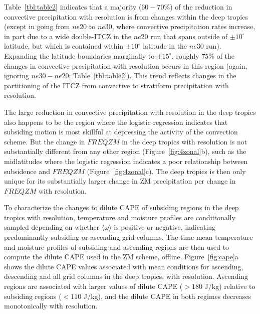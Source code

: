 \documentclass[times]{qjrms4}
\begin{document}
Table~\ref{tbl:table2} indicates that a majority ($60-70 \%$) of the reduction in convective precipitation with resolution is from changes within the deep tropics (except in going from $ne20$ to $ne30$, where convective precipitation rates increase, in part due to a wide double-ITCZ in the $ne20$ run that spans outside of $\pm 10^{\circ}$ latitude, but which is contained within $\pm 10^{\circ}$ latitude in the $ne30$ run). Expanding the latitude boundaries marginally to $\pm 15^{\circ}$, roughly $75\%$ of the changes in convective precipitation with resolution occurs in this region (again, ignoring $ne30-ne20$; Table~\ref{tbl:table2}). This trend reflects changes in the partitioning of the ITCZ from convective to stratiform precipitation with resolution. 

The large reduction in convective precipitation with resolution in the deep tropics also happens to be the region where the logistic regression indicates that subsiding motion is most skillful at depressing the activity of the convection scheme. But the change in $FREQZM$ in the deep tropics with resolution is not substantially different from any other region (Figure~\ref{fig:4zonal}b), such as the midlatitudes where the logistic regression indicates a poor relationship between subsidence and $FREQZM$ (Figure~\ref{fig:4zonal}c). The deep tropics is then only unique for its substantially larger change in ZM precipitation per change in $FREQZM$ with resolution.

To characterize the changes to dilute CAPE of subsiding regions in the deep tropics with resolution, temperature and moisture profiles are conditionally sampled depending on whether $\langle \omega \rangle$ is positive or negative, indicating predominantly subsiding or ascending grid columns. The time mean temperature and moisture profiles of subsiding and ascending regions are then used to compute the dilute CAPE used in the ZM scheme, offline. Figure~\ref{fig:cape}a shows the dilute CAPE values associated with mean conditions for ascending, descending and all grid columns in the deep tropics, with resolution. Ascending regions are associated with larger values of dilute CAPE ($>180$ J/kg) relative to subsiding regions ($<110$ J/kg), and the dilute CAPE in both regimes decreases monotonically with resolution. 
\end{document}
